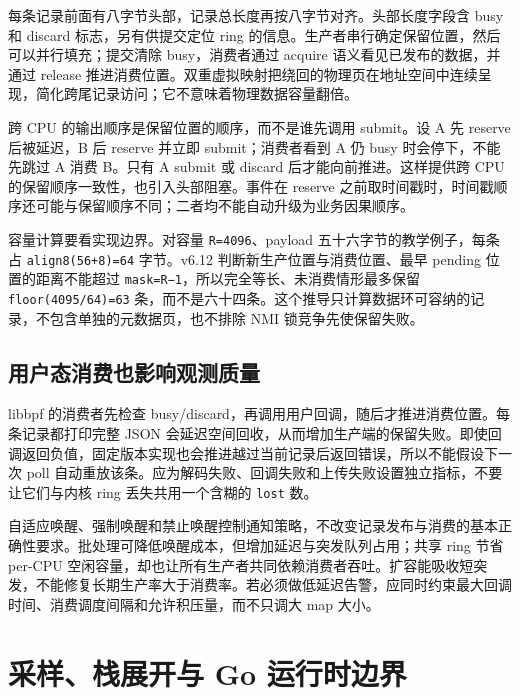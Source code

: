 \documentclass[UTF8,fontset=fandol,openany,11pt]{ctexbook}
\begin{document}
每条记录前面有八字节头部，记录总长度再按八字节对齐。头部长度字段含 busy 和 discard 标志，另有供提交定位 ring 的信息。生产者串行确定保留位置，然后可以并行填充；提交清除 busy，消费者通过 acquire 语义看见已发布的数据，并通过 release 推进消费位置。双重虚拟映射把绕回的物理页在地址空间中连续呈现，简化跨尾记录访问；它不意味着物理数据容量翻倍。\cite{eb-ring-doc}\cite{eb-ring-code}\cite{eb-ring-consume}


跨 CPU 的输出顺序是保留位置的顺序，而不是谁先调用 submit。设 A 先 reserve 后被延迟，B 后 reserve 并立即 submit；消费者看到 A 仍 busy 时会停下，不能先跳过 A 消费 B。只有 A submit 或 discard 后才能向前推进。这样提供跨 CPU 的保留顺序一致性，也引入头部阻塞。事件在 reserve 之前取时间戳时，时间戳顺序还可能与保留顺序不同；二者均不能自动升级为业务因果顺序。\cite{eb-ring-doc}\cite{eb-ring-code}\cite{eb-ring-consume}


容量计算要看实现边界。对容量 \texttt{R=4096}、payload 五十六字节的教学例子，每条占 \texttt{align8(56+8)=64} 字节。v6.12 判断新生产位置与消费位置、最早 pending 位置的距离不能超过 \texttt{mask=R−1}，所以完全等长、未消费情形最多保留 \texttt{floor(4095/\allowbreak{}64)=63} 条，而不是六十四条。这个推导只计算数据环可容纳的记录，不包含单独的元数据页，也不排除 NMI 锁竞争先使保留失败。\cite{eb-ring-code}


\subsection{用户态消费也影响观测质量}

libbpf 的消费者先检查 busy/discard，再调用用户回调，随后才推进消费位置。每条记录都打印完整 JSON 会延迟空间回收，从而增加生产端的保留失败。即使回调返回负值，固定版本实现也会推进越过当前记录后返回错误，所以不能假设下一次 poll 自动重放该条。应为解码失败、回调失败和上传失败设置独立指标，不要让它们与内核 ring 丢失共用一个含糊的 \texttt{lost} 数。\cite{eb-ring-consume}


自适应唤醒、强制唤醒和禁止唤醒控制通知策略，不改变记录发布与消费的基本正确性要求。批处理可降低唤醒成本，但增加延迟与突发队列占用；共享 ring 节省 per-CPU 空闲容量，却也让所有生产者共同依赖消费者吞吐。扩容能吸收短突发，不能修复长期生产率大于消费率。若必须做低延迟告警，应同时约束最大回调时间、消费调度间隔和允许积压量，而不只调大 map 大小。\cite{eb-ring-doc}\cite{eb-ring-consume}


\section{采样、栈展开与 Go 运行时边界}
\end{document}

